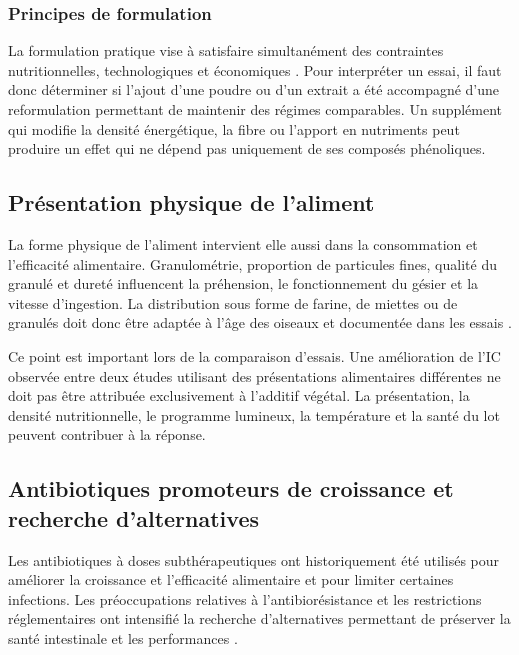 \subsubsection{Principes de formulation}

La formulation pratique vise à satisfaire simultanément des contraintes nutritionnelles, technologiques et économiques \citep{Aviagen2022,Aviagen2025}. Pour interpréter un essai, il faut donc déterminer si l'ajout d'une poudre ou d'un extrait a été accompagné d'une reformulation permettant de maintenir des régimes comparables. Un supplément qui modifie la densité énergétique, la fibre ou l'apport en nutriments peut produire un effet qui ne dépend pas uniquement de ses composés phénoliques.

\subsection{Présentation physique de l'aliment}

La forme physique de l'aliment intervient elle aussi dans la consommation et l'efficacité alimentaire. Granulométrie, proportion de particules fines, qualité du granulé et dureté influencent la préhension, le fonctionnement du gésier et la vitesse d'ingestion. La distribution sous forme de farine, de miettes ou de granulés doit donc être adaptée à l'âge des oiseaux et documentée dans les essais \citep{Svihus2014,Aviagen2025}.

Ce point est important lors de la comparaison d'essais. Une amélioration de l'IC observée entre deux études utilisant des présentations alimentaires différentes ne doit pas être attribuée exclusivement à l'additif végétal. La présentation, la densité nutritionnelle, le programme lumineux, la température et la santé du lot peuvent contribuer à la réponse.

\subsection{Antibiotiques promoteurs de croissance et recherche d'alternatives}

Les antibiotiques à doses subthérapeutiques ont historiquement été utilisés pour améliorer la croissance et l'efficacité alimentaire et pour limiter certaines infections. Les préoccupations relatives à l'antibiorésistance et les restrictions réglementaires ont intensifié la recherche d'alternatives permettant de préserver la santé intestinale et les performances \citep{Gadde2017}.

